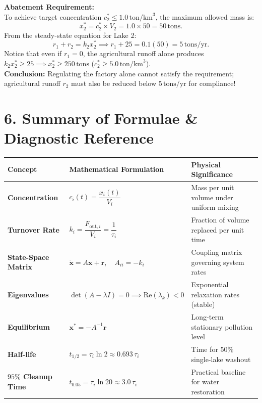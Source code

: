 \documentclass[12pt]{article}
\newcommand{\hcell}[1]{\textbf{\color{white}#1}}
\begin{document}
\begin{examplebox*}
\textbf{Abatement Requirement:}\\
To achieve target concentration $c_2^* \le 1.0\,\text{ton}/\text{km}^3$, the maximum allowed mass is:
\[
  x_2^* = c_2^* \times V_2 = 1.0 \times 50 = 50\,\text{tons}.
\]
From the steady-state equation for Lake 2:
\[
  r_1 + r_2 = k_2 x_2^* \implies r_1 + 25 = 0.1(50) = 5\,\text{tons}/\text{yr}.
\]
Notice that even if $r_1 = 0$, the agricultural runoff alone produces $k_2 x_2^* \ge 25 \implies x_2^* \ge 250\,\text{tons}$ ($c_2^* \ge 5.0\,\text{ton}/\text{km}^3$).\\
\textbf{Conclusion:} Regulating the factory alone cannot satisfy the requirement; agricultural runoff $r_2$ must also be reduced below $5\,\text{tons}/\text{yr}$ for compliance!
\end{examplebox*}

\vspace{10pt}

\section{6. Summary of Formulae \& Diagnostic Reference}

\begin{center}
\renewcommand{\arraystretch}{1.3}
\begin{tabular}{p{} p{} p{}}
  \toprule
  \rowcolor{primary}
  \hcell{Concept} & \hcell{Mathematical Formulation} & \hcell{Physical Significance} \\
  \midrule
  \rowcolor{lightbg}
  \textbf{Concentration} & $c_i(t) = \dfrac{x_i(t)}{V_i}$ & Mass per unit volume under uniform mixing \\
  \textbf{Turnover Rate} & $k_i = \dfrac{F_{\text{out}, i}}{V_i} = \dfrac{1}{\tau_i}$ & Fraction of volume replaced per unit time \\
  \rowcolor{lightbg}
  \textbf{State-Space Matrix} & $\dot{\mathbf{x}} = A\mathbf{x} + \mathbf{r}, \quad A_{ii} = -k_i$ & Coupling matrix governing system rates \\
  \textbf{Eigenvalues} & $\det(A - \lambda I) = 0 \implies \text{Re}(\lambda_k) < 0$ & Exponential relaxation rates (stable) \\
  \rowcolor{lightbg}
  \textbf{Equilibrium} & $\mathbf{x}^* = -A^{-1}\mathbf{r}$ & Long-term stationary pollution level \\
  \textbf{Half-life} & $t_{1/2} = \tau_i \ln 2 \approx 0.693\,\tau_i$ & Time for $50\%$ single-lake washout \\
  \rowcolor{lightbg}
  \textbf{$95\%$ Cleanup Time} & $t_{0.05} = \tau_i \ln 20 \approx 3.0\,\tau_i$ & Practical baseline for water restoration \\
  \bottomrule
\end{tabular}
\end{center}
\end{document}
